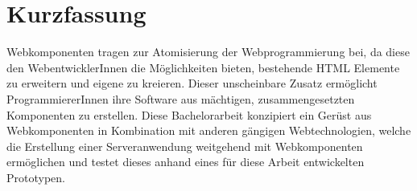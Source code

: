 \chapter{Kurzfassung}

Webkomponenten tragen zur Atomisierung der Webprogrammierung bei, da diese den WebentwicklerInnen die Möglichkeiten bieten, bestehende HTML Elemente zu erweitern und eigene zu kreieren. Dieser unscheinbare Zusatz ermöglicht ProgrammiererInnen ihre Software aus mächtigen, zusammengesetzten Komponenten zu erstellen.
Diese Bachelorarbeit konzipiert ein Gerüst aus Webkomponenten in Kombination mit anderen gängigen Webtechnologien, welche die Erstellung einer Serveranwendung weitgehend mit Webkomponenten ermöglichen und testet dieses anhand eines für diese Arbeit entwickelten Prototypen.


